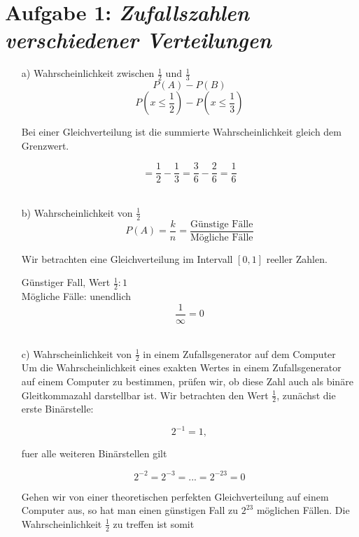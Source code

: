  

\section*{Aufgabe 1: \emph{Zufallszahlen verschiedener Verteilungen}}

\begin{itemize}
\item[a)] Wahrscheinlichkeit zwischen $\frac{1}{2}$ und $\frac{1}{3}$ \\

\[
P\left(A\right) - P\left(B\right)
\]
\[
P\left(x \le \frac{1}{2}\right) - P\left(x \le \frac{1}{3}\right)
\]

Bei einer Gleichverteilung ist die summierte Wahrscheinlichkeit gleich dem Grenzwert.

\[
= \frac{1}{2} - \frac{1}{3} = \frac{3}{6} - \frac{2}{6} = \frac{1}{6}
\]
 \\

\item[b)] Wahrscheinlichkeit von $\frac{1}{2}$ \\

\[
P(A) = \frac{k}{n} = \frac{\text{G\"unstige Fälle}} {\text{M\"ogliche Fälle}}
\]

Wir betrachten eine Gleichverteilung im Intervall $[0,1]$ reeller Zahlen.

Günstiger Fall, Wert $\frac{1}{2}: 1$ \\
Mögliche Fälle: unendlich
\[
\frac{1}{\infty} = 0
\]
\\

\item[c)] Wahrscheinlichkeit von $\frac{1}{2}$ in einem Zufallsgenerator auf dem Computer \\

Um die Wahrscheinlichkeit eines exakten Wertes in einem Zufallsgenerator auf einem
Computer zu bestimmen, pr\"ufen wir, ob diese Zahl auch als bin\"are Gleitkommazahl darstellbar ist.
Wir betrachten den Wert $\frac{1}{2}$, zun\"achst die erste Bin\"arstelle:

\[
 2^{-1} = 1,
\]

fuer alle weiteren Binärstellen gilt

\[
2^{-2} = 2^{-3} = ... = 2^{-23} = 0
\]

Gehen wir von einer theoretischen perfekten Gleichverteilung auf einem Computer aus, 
so hat man einen günstigen Fall zu $2^{23}$ möglichen Fällen.
Die Wahrscheinlichkeit $\frac{1}{2}$ zu treffen ist somit


\end{itemize}
